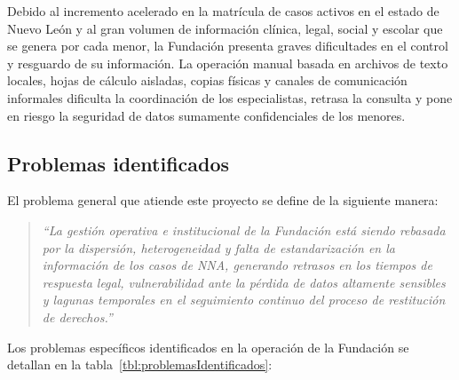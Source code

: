 Debido al incremento acelerado en la matrícula de casos activos en el estado de Nuevo León y al gran volumen de información clínica, legal, social y escolar que se genera por cada menor, la Fundación presenta graves dificultades en el control y resguardo de su información. La operación manual basada en archivos de texto locales, hojas de cálculo aisladas, copias físicas y canales de comunicación informales dificulta la coordinación de los especialistas, retrasa la consulta y pone en riesgo la seguridad de datos sumamente confidenciales de los menores.

\subsection{Problemas identificados}

El problema general que atiende este proyecto se define de la siguiente manera:

\begin{quote}
	{\em ``La gestión operativa e institucional de la Fundación está siendo rebasada por la dispersión, heterogeneidad y falta de estandarización en la información de los casos de NNA, generando retrasos en los tiempos de respuesta legal, vulnerabilidad ante la pérdida de datos altamente sensibles y lagunas temporales en el seguimiento continuo del proceso de restitución de derechos.''}
\end{quote}

Los problemas específicos identificados en la operación de la Fundación se detallan en la tabla~\ref{tbl:problemasIdentificados}:

